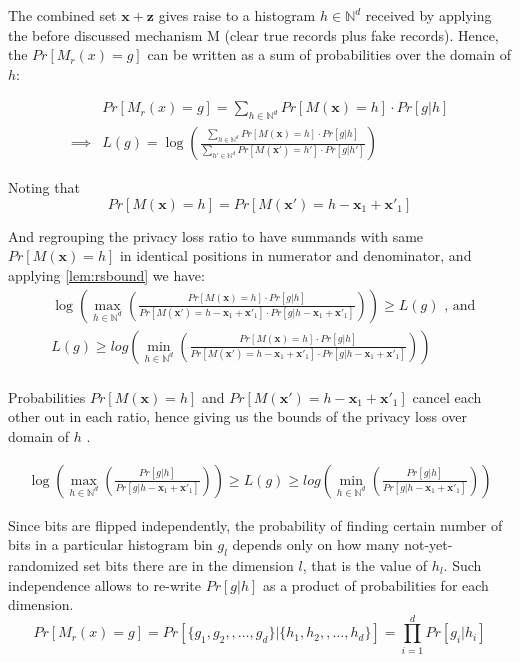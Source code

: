 \documentclass[11pt]{article}
\newcommand{\bbx}{\pmb{x}}
\newcommand{\bbz}{\pmb{z}}
\newcommand{\N}{\mathbb{N}}
\begin{document}
The combined set $\bbx + \bbz$ gives raise to a histogram $h \in \N^d$ received by applying the before discussed mechanism M (clear true records plus fake records).  Hence, the $Pr [ M_r(x) = g ]$ can be written as a sum of probabilities over the domain of $h$:

 \begin{align*}
 & Pr [ M_r(x) = g ] = \sum_{h \in \N^d} Pr \left [  M(\bbx) = h \right ] \cdot Pr [ g | h ]  \\
\implies &  L(g) =  \log  \left ( \frac{  \sum_{h \in \N^d} Pr \left [  M(\bbx) = h \right ] \cdot  Pr [ g | h ]   }{    \sum_{h' \in \N^d}  Pr \left [  M(\bbx') = h' \right ] \cdot   Pr[ g | h']   } \right )
\end{align*}

Noting that
\[
 Pr \left [  M(\bbx) = h \right ]  =  Pr \left [  M(\bbx') = h - \bbx_1 + \bbx'_1 \right ]
 \] 
 
And regrouping  the privacy loss ratio to have summands with same $Pr \left [  M(\bbx) = h \right ]$ in identical positions in numerator and denominator, and applying \eqref{lem:rsbound} we have:
 \begin{align*}
& \log \left ( \max_{h \in \N^d} \left ( \frac{  Pr \left [  M(\bbx) = h \right ] \cdot  Pr [ g | h ]   } {   Pr \left [  M(\bbx') = h - \bbx_1 + \bbx'_1 \right ] \cdot  Pr [ g | h  - \bbx_1 + \bbx'_1  ]  }    \right ) \right ) \ge L(g) \text{ , and } \\
& L(g) \ge  log \left ( \min_{h \in \N^d} \left ( \frac{  Pr \left [  M(\bbx) = h \right ] \cdot  Pr [ g | h ]   } {   Pr \left [  M(\bbx') = h - \bbx_1 + \bbx'_1 \right ] \cdot  Pr [ g | h  - \bbx_1 + \bbx'_1  ]  }  \right ) \right ) \\
\end{align*}

Probabilities $Pr \left [  M(\bbx) = h \right ]$ and $ Pr \left [  M(\bbx') = h - \bbx_1 + \bbx'_1 \right ]$ cancel each other out in each ratio, hence giving us the bounds of the privacy loss over domain of $h$ .

\begin{align*}
\log \left ( \max_{h \in \N^d} \left ( \frac{  Pr [ g | h ]   } { Pr [ g | h  - \bbx_1 + \bbx'_1  ]  }    \right ) \right ) \ge L(g) \ge  log \left ( \min_{h \in \N^d}  \left ( \frac{  Pr [ g | h ]   } {    Pr [ g | h  - \bbx_1 + \bbx'_1  ]  }  \right ) \right )
\end{align*}

Since bits are flipped independently, the probability of finding certain number of bits in a particular histogram bin $g_l$ depends only on how many not-yet-randomized set bits there are in the dimension $l$, that is the value of $h_l$.  Such independence allows to re-write $Pr [ g | h]$ as a product of probabilities for each dimension.
 \[
Pr [ M_r(x) = g ] = Pr [    \{ {g}_1, {g}_2, , \dots, {g}_d\} |  \{ {h}_1, {h}_2, , \dots, {h}_d\} ] = \prod_{i=1}^d Pr[ g_i | h_i] 
\]
\end{document}

